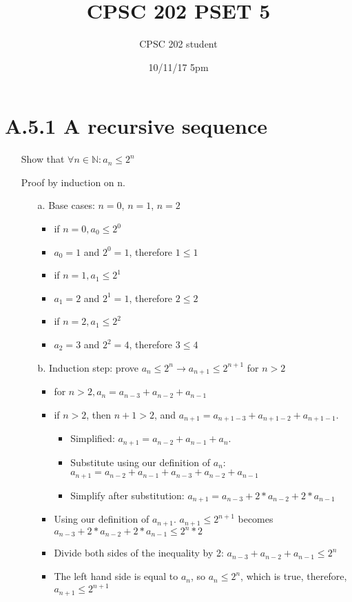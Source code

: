 \documentclass[12pt]{article}
\title{CPSC 202 PSET 5}
\author{CPSC 202 student}
\date{10/11/17 5pm}
\begin{document}
\maketitle

\newcommand{\E}{\mathrm{E}}
\newcommand{\Var}{\mathrm{Var}}
\newcommand{\Cov}{\mathrm{Cov}}

\section*{A.5.1 A recursive sequence}
\begin{enumerate}
  \item[] Show that ${\forall n \in \mathbb{N} : a_n \leq 2^n}$

    Proof by induction on n.
    \begin{enumerate}
      \item[a.] Base cases: ${n = 0}$, ${n = 1}$, ${n = 2}$
       \begin{itemize}
         \item if ${n=0, a_0 \leq 2^0}$
         \item ${a_0 = 1}$ and ${2^0 = 1}$, therefore ${1 \leq 1}$
         \item if ${n=1, a_1 \leq 2^1}$
         \item ${a_1 = 2}$ and ${2^1 = 1}$, therefore ${2 \leq 2}$
         \item if ${n=2, a_1 \leq 2^2}$
         \item ${a_2 = 3}$ and ${2^2 = 4}$, therefore ${3 \leq 4}$
       \end{itemize}
     \item[b.] Induction step: prove ${a_n \leq 2^n \rightarrow a_{n+1} \leq 2^{n+1}}$ for ${n > 2}$
       \begin{itemize}
         \item for ${n > 2, a_n = a_{n-3} + a_{n-2} + a_{n-1}}$
         \item if ${n > 2}$, then ${n + 1 > 2}$, and ${a_{n+1} = a_{n+1-3} + a_{n+1-2} + a_{n+1-1}}$. 
           \begin{itemize}
             \item Simplified: ${a_{n+1} = a_{n-2} + a_{n-1} + a_n}$. 
             \item Substitute using our definition of ${a_n}$: ${a_{n+1} = a_{n-2} + a_{n-1} + a_{n-3} + a_{n-2} + a_{n-1}}$
             \item Simplify after substitution: ${a_{n+1} = a_{n-3} + 2*a_{n-2} + 2*a_{n-1}}$
           \end{itemize}
         \item Using our definition of ${a_{n+1}}$. ${a_{n+1} \leq 2^{n+1}}$ becomes ${a_{n-3} + 2*a_{n-2} + 2*a_{n-1} \leq 2^n * 2}$
       \item Divide both sides of the inequality by 2: ${a_{n-3} + a_{n-2} + a_{n-1} \leq 2^n}$
       \item The left hand side is equal to ${a_n}$, so ${a_n \leq 2^n}$, which is true, therefore, ${a_{n+1} \leq 2^{n+1}}$
     \end{itemize}
    \end{enumerate}
\end{enumerate}
\end{document}
